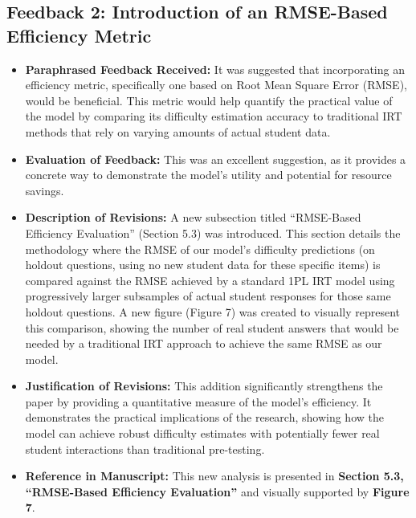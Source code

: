\documentclass[
    a4paper, %
    10pt, %
    twoside, %
]{LTJournalArticle}
\begin{document}
\subsection*{Feedback 2: Introduction of an RMSE-Based Efficiency Metric}
\begin{itemize}
    \item \textbf{Paraphrased Feedback Received:} It was suggested that incorporating an efficiency metric, specifically one based on Root Mean Square Error (RMSE), would be beneficial. This metric would help quantify the practical value of the model by comparing its difficulty estimation accuracy to traditional IRT methods that rely on varying amounts of actual student data.
    \item \textbf{Evaluation of Feedback:} This was an excellent suggestion, as it provides a concrete way to demonstrate the model's utility and potential for resource savings.
    \item \textbf{Description of Revisions:} A new subsection titled ``RMSE-Based Efficiency Evaluation'' (Section 5.3) was introduced. This section details the methodology where the RMSE of our model's difficulty predictions (on holdout questions, using no new student data for these specific items) is compared against the RMSE achieved by a standard 1PL IRT model using progressively larger subsamples of actual student responses for those same holdout questions. A new figure (Figure 7) was created to visually represent this comparison, showing the number of real student answers that would be needed by a traditional IRT approach to achieve the same RMSE as our model.
    \item \textbf{Justification of Revisions:} This addition significantly strengthens the paper by providing a quantitative measure of the model's efficiency. It demonstrates the practical implications of the research, showing how the model can achieve robust difficulty estimates with potentially fewer real student interactions than traditional pre-testing.
    \item \textbf{Reference in Manuscript:} This new analysis is presented in \textbf{Section 5.3, ``RMSE-Based Efficiency Evaluation''} and visually supported by \textbf{Figure 7}.
\end{itemize}
\end{document}
